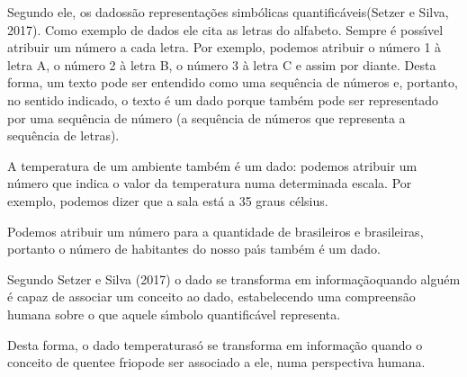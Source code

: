 \documentclass[
12pt,		%
openright,	%
twoside,  %
a4paper,			%
chapter=TITLE,		%
english,			%
french,				%
spanish,			%
brazil				%
]{USPSC-classe/USPSC}
\begin{document}
Segundo ele, os \textquotedbl dados\textquotedbl  s\~ao \textquotedbl representa\c{c}\~oes simb\'olicas quantific\'aveis\textquotedbl   (Setzer e Silva, 2017). Como exemplo de dados ele cita as letras do alfabeto. Sempre \'e poss\'{\i}vel atribuir um n\'umero a cada letra. Por exemplo, podemos atribuir o n\'umero 1 \`a letra A, o n\'umero 2 \`a letra B, o n\'umero 3 \`a letra C e assim por diante. Desta forma, um texto pode ser entendido como uma sequ\^encia de n\'umeros e, portanto, no sentido indicado, o texto \'e um dado porque tamb\'em pode ser representado por uma sequ\^encia de n\'umero (a sequ\^encia de n\'umeros que representa a sequ\^encia de letras).










A temperatura de um ambiente tamb\'em \'e um dado: podemos atribuir um n\'umero que indica o valor da temperatura numa determinada escala. Por exemplo, podemos dizer que a sala \textquotedbl est\'a a 35 graus c\'elsius\textquotedbl .










Podemos atribuir um n\'umero para a quantidade de brasileiros e brasileiras, portanto o n\'umero de habitantes do nosso pa\'{\i}s tamb\'em \'e um dado.










Segundo Setzer e Silva (2017) o dado se transforma em \textquotedbl informa\c{c}\~ao\textquotedbl  quando algu\'em \'e capaz de associar um conceito ao dado, estabelecendo uma compreens\~ao humana sobre o que aquele s\'{\i}mbolo quantific\'avel representa.










Desta forma, o dado \textquotedbl temperatura\textquotedbl  s\'o se transforma em informa\c{c}\~ao quando o conceito de \textquotedbl quente\textquotedbl  e \textquotedbl frio\textquotedbl  pode ser associado a ele, numa perspectiva humana.
\end{document}
